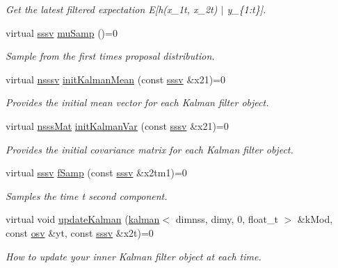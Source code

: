 \begin{DoxyCompactItemize}
\begin{DoxyCompactList}\small\item\em Get the latest filtered expectation E\mbox{[}h(x\+\_\+1t, x\+\_\+2t) $\vert$ y\+\_\+\{1\+:t\}\mbox{]}. \end{DoxyCompactList}\item 
virtual \hyperlink{classrbpf__kalman__bs_a2b40c9fa0d7a2ca42be3d0c43db0db8b}{sssv} \hyperlink{classrbpf__kalman__bs_addafd7af8bf500d23a09aad34bf9cf0b}{mu\+Samp} ()=0
\begin{DoxyCompactList}\small\item\em Sample from the first time\textquotesingle{}s proposal distribution. \end{DoxyCompactList}\item 
virtual \hyperlink{classrbpf__kalman__bs_a896c6ca25182e5569df4bfa6c40f9a54}{nsssv} \hyperlink{classrbpf__kalman__bs_a8bb7a29b1bcc66cfb4ebf86c0d091ec1}{init\+Kalman\+Mean} (const \hyperlink{classrbpf__kalman__bs_a2b40c9fa0d7a2ca42be3d0c43db0db8b}{sssv} \&x21)=0
\begin{DoxyCompactList}\small\item\em Provides the initial mean vector for each Kalman filter object. \end{DoxyCompactList}\item 
virtual \hyperlink{classrbpf__kalman__bs_a0d3dfd24b849c0bf33fa3df8ce56dd07}{nsss\+Mat} \hyperlink{classrbpf__kalman__bs_add33853e65897cc359965d3715e4e20f}{init\+Kalman\+Var} (const \hyperlink{classrbpf__kalman__bs_a2b40c9fa0d7a2ca42be3d0c43db0db8b}{sssv} \&x21)=0
\begin{DoxyCompactList}\small\item\em Provides the initial covariance matrix for each Kalman filter object. \end{DoxyCompactList}\item 
virtual \hyperlink{classrbpf__kalman__bs_a2b40c9fa0d7a2ca42be3d0c43db0db8b}{sssv} \hyperlink{classrbpf__kalman__bs_afce6418525aea80ea8f073eda77bb6f4}{f\+Samp} (const \hyperlink{classrbpf__kalman__bs_a2b40c9fa0d7a2ca42be3d0c43db0db8b}{sssv} \&x2tm1)=0
\begin{DoxyCompactList}\small\item\em Samples the time t second component. \end{DoxyCompactList}\item 
virtual void \hyperlink{classrbpf__kalman__bs_a3a382531f3af3856735ce031e34a5f54}{update\+Kalman} (\hyperlink{classkalman}{kalman}$<$ dimnss, dimy, 0, float\+\_\+t $>$ \&k\+Mod, const \hyperlink{classrbpf__kalman__bs_a51f159fe3b1d23742ba06d82d4724186}{osv} \&yt, const \hyperlink{classrbpf__kalman__bs_a2b40c9fa0d7a2ca42be3d0c43db0db8b}{sssv} \&x2t)=0
\begin{DoxyCompactList}\small\item\em How to update your inner Kalman filter object at each time. \end{DoxyCompactList}\end{DoxyCompactItemize}
